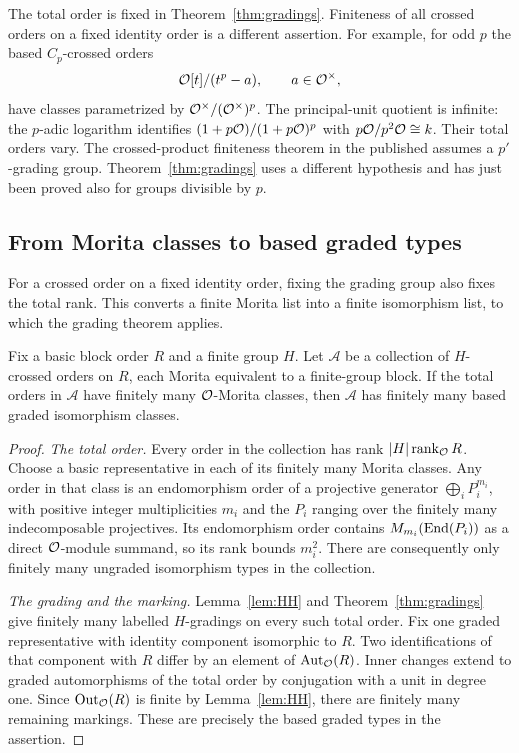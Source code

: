 \begin{remark}\label{rem:fixed-total}
The total order is fixed in Theorem~\ref{thm:gradings}.  Finiteness
of all crossed orders on a fixed identity order is a different
assertion.  For example, for odd $p$ the based $C_p$-crossed orders
\[
 \mathcal O[t]/(t^p-a),\qquad a\in\mathcal O^\times,
\]
have classes parametrized by $\mathcal O^\times/(\mathcal O^\times)^p$.
The principal-unit quotient is infinite: the $p$-adic logarithm
identifies $(1+p\mathcal O)/(1+p\mathcal O)^p$ with
$p\mathcal O/p^2\mathcal O\cong k$.  Their total orders vary.
The crossed-product finiteness theorem in the published
\cite[Corollary~4.9]{EiseleReduction2021} assumes a $p'$-grading
group.  Theorem~\ref{thm:gradings} uses a different hypothesis and
has just been proved also for groups divisible by $p$.
\end{remark}

\subsection{From Morita classes to based graded types}

For a crossed order on a fixed identity order, fixing the grading
group also fixes the total rank.  This converts a finite Morita list
into a finite isomorphism list, to which the grading theorem applies.

\begin{proposition}\label{prop:marked}
Fix a basic block order $R$ and a finite group $H$.  Let
$\mathcal A$ be a collection of $H$-crossed orders on $R$, each
Morita equivalent to a finite-group block.  If the total orders
in $\mathcal A$ have finitely many $\mathcal O$-Morita classes, then
$\mathcal A$ has finitely many based graded isomorphism classes.
\end{proposition}

\begin{proof}
\emph{The total order.}
Every order in the collection has rank $|H|\operatorname{rank}_{\mathcal O}R$.
Choose a basic representative in each of its finitely many
Morita classes.  Any order in that class is an endomorphism
order of a projective generator
$\bigoplus_i P_i^{m_i}$, with positive integer multiplicities
$m_i$ and the $P_i$ ranging over the finitely many indecomposable
projectives.  Its endomorphism order contains
$M_{m_i}(\operatorname{End}(P_i))$ as a direct $\mathcal O$-module summand, so its
rank bounds $m_i^2$.  There are consequently only finitely many
ungraded isomorphism types in the collection.

\emph{The grading and the marking.}
Lemma~\ref{lem:HH} and Theorem~\ref{thm:gradings} give finitely
many labelled $H$-gradings on every such total order.  Fix one
graded representative with identity component isomorphic to
$R$.  Two identifications of that component with $R$ differ by
an element of $\operatorname{Aut}_{\mathcal O}(R)$.  Inner changes extend to graded
automorphisms of the total order by conjugation with a unit in
degree one.  Since $\operatorname{Out}_{\mathcal O}(R)$ is finite by
Lemma~\ref{lem:HH}, there are finitely many remaining markings.
These are precisely the based graded types in the assertion.
\end{proof}
